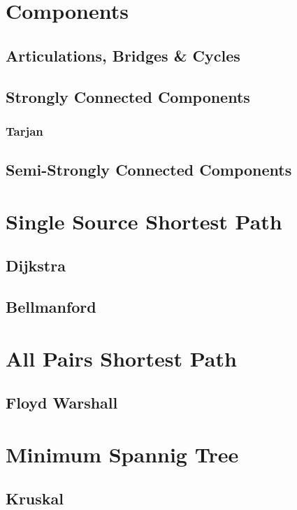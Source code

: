 \documentclass[10pt,a4paper]{report}
\begin{document}
	\section{Components}
		\subsection{Articulations, Bridges \& Cycles}
		\newpage
		\subsection{Strongly Connected Components}
			\subsubsection{Tarjan}
				
		\subsection{Semi-Strongly Connected Components}
	
	\section{Single Source Shortest Path}
		\subsection{Dijkstra}
		\subsection{Bellmanford}
			
		
	\section{All Pairs Shortest Path}
		\subsection{Floyd Warshall}
		
	\section{Minimum Spannig Tree}
		\subsection{Kruskal}
\end{document}
